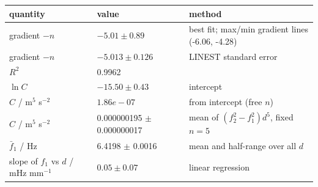 \begin{tabular}{@{}lll@{}}
\toprule
quantity & value & method \\
\midrule
gradient $-n$ & $-5.01 \pm 0.89$ & best fit; max/min gradient lines (-6.06, -4.28) \\
gradient $-n$ & $-5.013 \pm 0.126$ & LINEST standard error \\
$R^2$ & 0.9962 & \\
$\ln C$ & $-15.50 \pm 0.43$ & intercept \\
$C$ / m$^5$ s$^{-2}$ & $1.86e-07$ & from intercept (free $n$) \\
$C$ / m$^5$ s$^{-2}$ & 0.000000195 $\pm$ 0.000000017 & mean of $(f_2^2-f_1^2)d^5$, fixed $n=5$ \\
$\bar f_1$ / Hz & 6.4198 $\pm$ 0.0016 & mean and half-range over all $d$ \\
slope of $f_1$ vs $d$ / mHz mm$^{-1}$ & $0.05 \pm 0.07$ & linear regression \\
\bottomrule
\end{tabular}